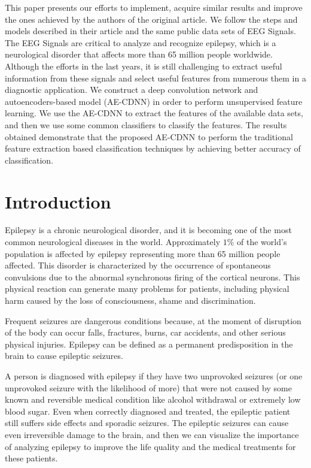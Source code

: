 
This paper presents our efforts to implement, acquire similar results and improve the ones achieved by the authors of the original article. We follow the steps and models described in their article and the same public data sets of EEG Signals. The EEG Signals are critical to analyze and recognize epilepsy, which is a neurological disorder that affects more than 65 million people worldwide. Although the efforts in the last years, it is still challenging to extract useful information from these signals and select useful features from numerous them in a diagnostic application. We construct a deep convolution network and autoencoders-based model (AE-CDNN) in order to perform unsupervised feature learning. We use the AE-CDNN to extract the features of the available data sets, and then we use some common classifiers to classify the features. The results obtained demonstrate that the proposed AE-CDNN to perform the traditional feature extraction based classification techniques by achieving better accuracy of classification.

\section{Introduction}

Epilepsy is a chronic neurological disorder, and it is becoming one of the most common neurological diseases in the world. Approximately $1\%$ of the world's population is affected by epilepsy representing more than 65 million people affected. This disorder is characterized by the occurrence of spontaneous convulsions due to the abnormal synchronous firing of the cortical neurons. This physical reaction can generate many problems for patients, including physical harm caused by the loss of consciousness, shame and discrimination.

Frequent seizures are dangerous conditions because, at the moment of disruption of the body can occur falls, fractures, burns, car accidents, and other serious physical injuries. Epilepsy can be defined as a permanent predisposition in the brain to cause epileptic seizures.

A person is diagnosed with epilepsy if they have two unprovoked seizures (or one unprovoked seizure with the likelihood of more) that were not caused by some known and reversible medical condition like alcohol withdrawal or extremely low blood sugar. Even when correctly diagnosed and treated, the epileptic patient still suffers side effects and sporadic seizures. The epileptic seizures can cause even irreversible damage to the brain, and then we can visualize the importance of analyzing epilepsy to improve the life quality and the medical treatments for these patients.

